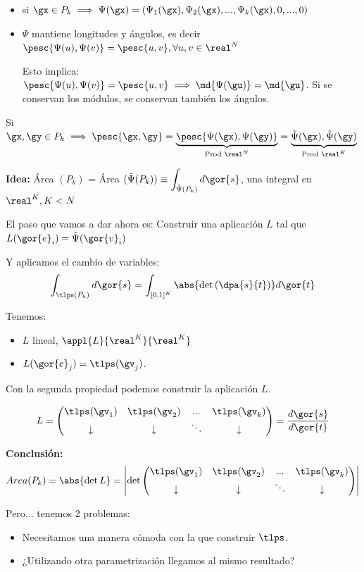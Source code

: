 \begin{itemize}
\item si $\gx \in P_k \implies \Psi(\gx) = (\Psi_1(\gx),\Psi_2(\gx),...,\Psi_k(\gx),0,...,0)$
\item $\Psi$ mantiene longitudes y ángulos, es decir $\pesc{\Psi(u),\Psi(v)}=\pesc{u,v}, \forall u,v\in\real^N$

Esto implica: $\pesc{\Psi(u),\Psi(v)}=\pesc{u,v} \implies \md{\Psi(\gu)} = \md{\gu}$. Si se conservan los módulos, se conservan también los ángulos.
\end{itemize}

\obs Si $\gx,\gy\in P_k \implies \pesc{\gx,\gy} = \underbrace{\pesc{\Psi(\gx),\Psi(\gy)}}_{\text{Prod } \real^N} = \underbrace{{\tilde{\Psi}(\gx),\tilde{\Psi}(\gy)}}_{\text{Prod } \real^K}$


\textbf{Idea:} Área $(P_k)$ = Área $(\tilde{\Psi}(P_k)) \equiv \displaystyle \int_{\tilde{\Psi}(P_k)}d\gor{s}$, una integral en $\real^K, K<N$



El paso que vamos a dar ahora es: Construir una aplicación $L$ tal que $L(\gor{e}_i) = \tilde{\Psi}(\gor{v}_i)$

Y aplicamos el cambio de variables:
\[\int_{\tlps(P_k)} d\gor{s} = \int_{[0,1]^K} \abs{\det\left( \dpa{s}{t} \right)} d\gor{t}\]

Tenemos:
\begin{itemize}
\item $L$ lineal, $\appl{L}{\real^K}{\real^K}$
\item $L(\gor{e}_j) = \tlps(\gv_j)$.
\end{itemize}
Con la segunda propiedad podemos construir la aplicación $L$.

\begin{gather*}
L = \begin{pmatrix} \tlps(\gv_1) & \tlps(\gv_2) & ... & \tlps(\gv_k)\\
\downarrow & \downarrow & \ddots & \downarrow
\end{pmatrix} = \frac{d\gor{s}}{d\gor{t}}\end{gather*}

\textbf{Conclusión:} \[Area(P_k) = \abs{\det L} = \left|\det \begin{pmatrix}
\tlps(\gv_1) & \tlps(\gv_2) & ... & \tlps(\gv_k)\\
\downarrow & \downarrow & \ddots & \downarrow
\end{pmatrix}\right|\]

Pero... tenemos 2 problemas:
\begin{itemize}
\item Necesitamos una manera cómoda con la que construir $\tlps$.
\item ¿Utilizando otra parametrización llegamos al mismo resultado?
\end{itemize}


